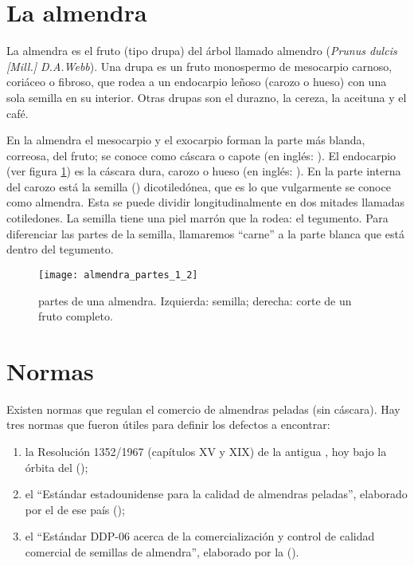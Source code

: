 \section{La almendra}
La almendra es el fruto (tipo drupa) del árbol llamado almendro (\textit{Prunus dulcis [Mill.] D.A.Webb}). Una drupa es un fruto monospermo de mesocarpio carnoso, coriáceo o fibroso, que rodea a un endocarpio leñoso (carozo o hueso) con una sola semilla en su interior. Otras drupas son el durazno, la cereza, la aceituna y el café.

En la almendra el mesocarpio y el exocarpio forman la parte más blanda, correosa, del fruto; se conoce como cáscara o capote (en inglés: ). El endocarpio (ver figura \ref{fig:partesalmendra}) es la cáscara dura, carozo o hueso (en inglés: ). En la parte interna del carozo está la semilla () dicotiledónea, que es lo que vulgarmente se conoce como almendra. Esta se puede dividir longitudinalmente en dos mitades llamadas cotiledones. La semilla tiene una piel marrón que la rodea: el tegumento. Para diferenciar las partes de la semilla, llamaremos \enquote{carne} a la parte blanca que está dentro del tegumento.


\begin{figure}[hbtp]
\centering
\texttt{[image: almendra\_partes\_1\_2]}
\caption[Partes de una almendra]{partes de una almendra. Izquierda: semilla; derecha: corte de un fruto completo.~\autocite[][]{imagenes:interioralmendra}}
\label{fig:partesalmendra}
\end{figure}




\section{Normas}
Existen normas que regulan el comercio de almendras peladas (sin cáscara). Hay tres normas que fueron útiles para definir los defectos a encontrar: 
\begin{enumerate}
\item la Resolución \num{1352/1967} (capítulos XV y XIX) de la antigua , hoy bajo la órbita del  ();~\autocite{standards:res1352}

\item el \enquote{Estándar estadounidense para la calidad de almendras peladas}, elaborado por el  de ese país ();~\autocite{standards:usda}

\item el \enquote{Estándar DDP-06 acerca de la comercialización y control de calidad comercial de semillas de almendra}, elaborado por la  ().~\autocite{standards:unece}

\end{enumerate}

